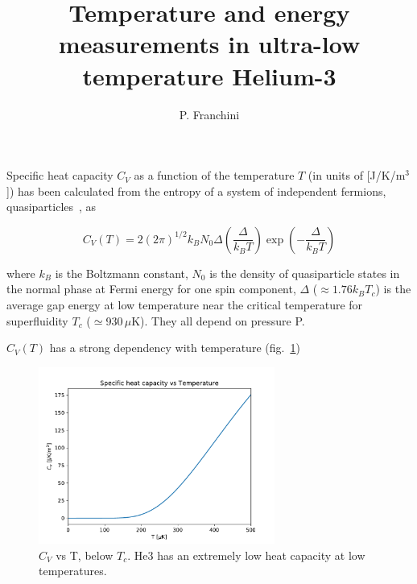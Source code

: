 \documentclass[a4paper,12pt]{article}
\title{Temperature and energy measurements in ultra-low temperature Helium-3}
\author{P. Franchini}
\begin{document}
\maketitle



Specific heat capacity $C_V$ as a function of the temperature $T$ (in units of [J/K/m$^3$]) has been calculated from the entropy of a system of independent fermions, quasiparticles~\cite{vollhardt}, as

\begin{equation}
C_V(T)=2(2\pi)^{1/2}k_BN_0\Delta\left(\frac{\Delta}{k_BT}\right)\exp\left(-\frac{\Delta}{k_BT}\right)
\end{equation}

where $k_B$ is the Boltzmann constant, $N_0$ is the density of quasiparticle states in the normal phase at Fermi energy for one spin component, $\Delta$ ($\approx 1.76 k_B T_c$) is the average gap energy at low temperature near the critical temperature for superfluidity $T_c$ ($\simeq$930\,$\mu$K). They all depend on pressure P.

$C_V(T)$ has a strong dependency with temperature (fig.~\ref{fig:CvT})

\begin{figure}[htb]
  \begin{center}
    \includegraphics[width=0.69\textwidth]{Cv_vs_T-zoom}
  \end{center}
  \caption{$C_V$ vs T, below $T_c$. He3 has an extremely low heat capacity at low temperatures.}
  \label{fig:CvT}
\end{figure}
\end{document}
